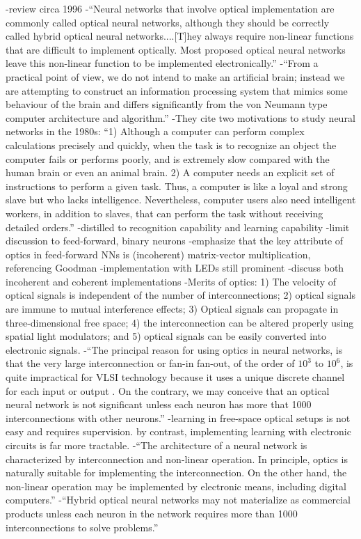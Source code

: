 \cite{juyu1996}
-review circa 1996
-``Neural networks that involve optical implementation are commonly called optical neural networks, although they should be correctly called hybrid optical neural networks....[T]hey always require non-linear functions that are difficult to implement optically. Most proposed optical neural networks leave this non-linear function to be implemented electronically.'' 
-``From a practical point of view, we do not intend to make an artificial brain; instead we are attempting to construct an information processing system that mimics some behaviour of the brain and differs significantly from the von Neumann type computer architecture and algorithm.''
-They cite two motivations to study neural networks in the 1980s: ``1) Although a computer can perform complex calculations precisely and quickly, when the task is to recognize an object the computer fails or performs poorly, and is extremely slow compared with the human brain or even an animal brain. 2) A computer needs an explicit set of instructions to perform a given task. Thus, a computer is like a loyal and strong slave but who lacks intelligence. Nevertheless, computer users also need intelligent workers, in addition to slaves, that can perform the task without receiving detailed orders.''
-distilled to recognition capability and learning capability
-limit discussion to feed-forward, binary neurons
-emphasize that the key attribute of optics in feed-forward NNs is (incoherent) matrix-vector multiplication, referencing Goodman \cite{godi1978}
-implementation with LEDs still prominent
-discuss both incoherent and coherent implementations
-Merits of optics: 1) The velocity of optical signals is independent of the number of interconnections; 2) optical signals are immune to mutual interference effects; 3) Optical signals can propagate in three-dimensional free space; 4) the interconnection can be altered properly using spatial light modulators; and 5) optical signals can be easily converted into electronic signals.
-``The principal reason for using optics in neural networks, is that the very large interconnection or fan-in fan-out, of the order of $10^3$ to $10^6$, is quite impractical for VLSI technology because it uses a unique discrete channel for each input or output \cite{caki1989}. On the contrary, we may conceive that an optical neural network is not significant unless each neuron has more that 1000 interconnections with other neurons.''
-learning in free-space optical setups is not easy and requires supervision. by contrast, implementing learning with electronic circuits is far more tractable.
-``The architecture of a neural network is characterized by interconnection and non-linear operation. In principle, optics is naturally suitable for implementing the interconnection. On the other hand, the non-linear operation may be implemented by electronic means, including digital computers.''
-``Hybrid optical neural networks may not materialize as commercial products unless each neuron in the network requires more than 1000 interconnections to solve problems.''


